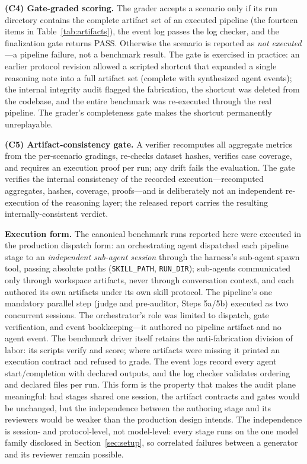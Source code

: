 \documentclass[preprint,12pt]{elsarticle}
\begin{document}
\textbf{(C4) Gate-graded scoring.} The grader accepts a scenario only if its run directory contains the complete artifact set of an executed pipeline (the fourteen items in Table~\ref{tab:artifacts}), the event log passes the log checker, and the finalization gate returns PASS. Otherwise the scenario is reported as \emph{not executed}---a pipeline failure, not a benchmark result. The gate is exercised in practice: an earlier protocol revision allowed a scripted shortcut that expanded a single reasoning note into a full artifact set (complete with synthesized agent events); the internal integrity audit flagged the fabrication, the shortcut was deleted from the codebase, and the entire benchmark was re-executed through the real pipeline. The grader's completeness gate makes the shortcut permanently unreplayable.

\textbf{(C5) Artifact-consistency gate.} A verifier recomputes all aggregate metrics from the per-scenario gradings, re-checks dataset hashes, verifies case coverage, and requires an execution proof per run; any drift fails the evaluation. The gate verifies the internal consistency of the recorded execution---recomputed aggregates, hashes, coverage, proofs---and is deliberately not an independent re-execution of the reasoning layer; the released report carries the resulting internally-consistent verdict.

\textbf{Execution form.} The canonical benchmark runs reported here were executed in the production dispatch form: an orchestrating agent dispatched each pipeline stage to an \emph{independent sub-agent session} through the harness's sub-agent spawn tool, passing absolute paths (\texttt{SKILL\_PATH}, \texttt{RUN\_DIR}); sub-agents communicated only through workspace artifacts, never through conversation context, and each authored its own artifacts under its own skill protocol. The pipeline's one mandatory parallel step (judge and pre-auditor, Steps 5a/5b) executed as two concurrent sessions. The orchestrator's role was limited to dispatch, gate verification, and event bookkeeping---it authored no pipeline artifact and no agent event. The benchmark driver itself retains the anti-fabrication division of labor: its scripts verify and score; where artifacts were missing it printed an execution contract and refused to grade. The event logs record every agent start/completion with declared outputs, and the log checker validates ordering and declared files per run. This form is the property that makes the audit plane meaningful: had stages shared one session, the artifact contracts and gates would be unchanged, but the independence between the authoring stage and its reviewers would be weaker than the production design intends. The independence is session- and protocol-level, not model-level: every stage runs on the one model family disclosed in Section~\ref{sec:setup}, so correlated failures between a generator and its reviewer remain possible.
\end{document}
